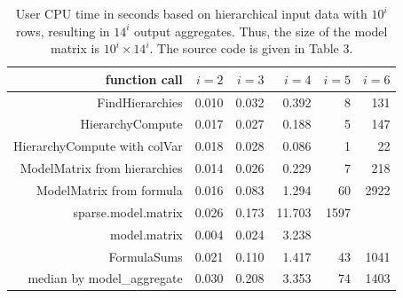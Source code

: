 \begin{table}[p]

\caption{\label{tab:tab1-pdf}User CPU time in seconds based on hierarchical input data with $10^i$ rows, resulting in $14^i$ output aggregates. Thus, the size of the model matrix is $10^i \times 14^i$. The source code is given in Table 3.}
\centering
\begin{tabular}[t]{r|r|r|r|r|r}
\hline
function call & $i = 2$ & $i = 3$ & $i = 4$ & $i = 5$ & $i = 6$\\
\hline
FindHierarchies & 0.010 & 0.032 & 0.392 & 8 & 131\\
\hline
HierarchyCompute & 0.017 & 0.027 & 0.188 & 5 & 147\\
\hline
HierarchyCompute with colVar & 0.018 & 0.028 & 0.086 & 1 & 22\\
\hline
ModelMatrix from hierarchies & 0.014 & 0.026 & 0.229 & 7 & 218\\
\hline
ModelMatrix from formula & 0.016 & 0.083 & 1.294 & 60 & 2922\\
\hline
sparse.model.matrix & 0.026 & 0.173 & 11.703 & 1597 & \\
\hline
model.matrix & 0.004 & 0.024 & 3.238 &  & \\
\hline
FormulaSums & 0.021 & 0.110 & 1.417 & 43 & 1041\\
\hline
median by model\_aggregate & 0.030 & 0.208 & 3.353 & 74 & 1403\\
\hline
\end{tabular}
\vspace{20pt} \end{table}

